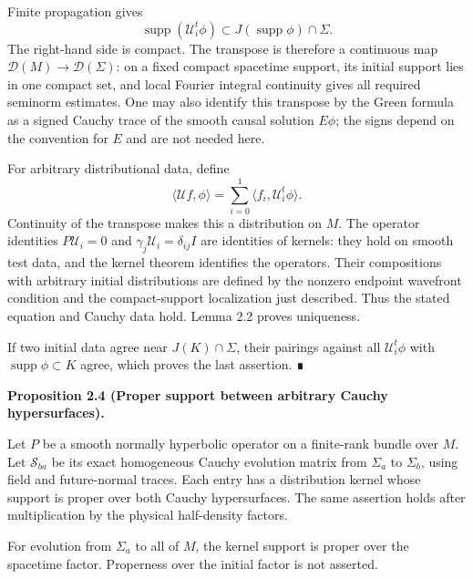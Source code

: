 \documentclass[
  english,
  11pt,
  reqno]{amsart}
\makeatletter
\newcommand{\pandocstatementheading}[1]{%
  \par\if@nobreak\else
    \addpenalty{\@beginparpenalty}%
    \addvspace{.5\baselineskip plus .2\baselineskip minus .2\baselineskip}%
  \fi
  {\normalfont\bfseries #1\par}%
  \nobreak\@afterindenttrue\@afterheading
}
\makeatother
\begin{document}
Finite propagation gives \[
\operatorname{supp}(\mathcal U_i^t\phi)
\subset J(\operatorname{supp}\phi)\cap\Sigma.
\] The right-hand side is compact. The transpose is therefore a
continuous map \(\mathcal D(M)\to\mathcal D(\Sigma)\): on a fixed
compact spacetime support, its initial support lies in one compact set,
and local Fourier integral continuity gives all required seminorm
estimates. One may also identify this transpose by the Green formula as
a signed Cauchy trace of the smooth causal solution \(E\phi\); the signs
depend on the convention for \(E\) and are not needed here.

For arbitrary distributional data, define \[
\langle\mathcal U f,\phi\rangle
=\sum_{i=0}^1\langle f_i,\mathcal U_i^t\phi\rangle.
\] Continuity of the transpose makes this a distribution on \(M\). The
operator identities \(P\mathcal U_i=0\) and
\(\gamma_j\mathcal U_i=\delta_{ij}I\) are identities of kernels: they
hold on smooth test data, and the kernel theorem identifies the
operators. Their compositions with arbitrary initial distributions are
defined by the nonzero endpoint wavefront condition and the
compact-support localization just described. Thus the stated equation
and Cauchy data hold. Lemma 2.2 proves uniqueness.

If two initial data agree near \(J(K)\cap\Sigma\), their pairings
against all \(\mathcal U_i^t\phi\) with
\(\operatorname{supp}\phi\subset K\) agree, which proves the last
assertion. ∎

\pandocstatementheading{\protect{}\label{prop:proper-cauchy-evolution}Proposition 2.4 (Proper support between arbitrary Cauchy hypersurfaces).}

Let \(P\) be a smooth normally hyperbolic operator on a finite-rank
bundle over \(M\). Let \(\mathcal S_{ba}\) be its exact homogeneous
Cauchy evolution matrix from \(\Sigma_a\) to \(\Sigma_b\), using field
and future-normal traces. Each entry has a distribution kernel whose
support is proper over both Cauchy hypersurfaces. The same assertion
holds after multiplication by the physical half-density factors.

For evolution from \(\Sigma_a\) to all of \(M\), the kernel support is
proper over the spacetime factor. Properness over the initial factor is
not asserted.
\end{document}
